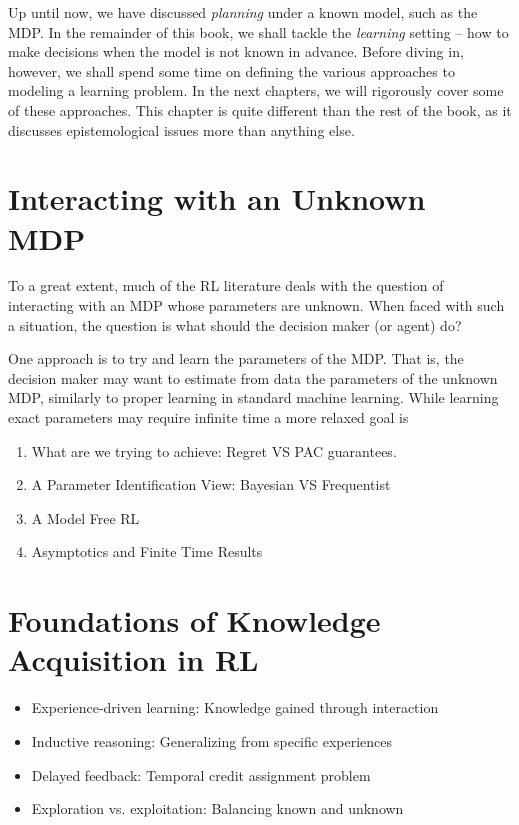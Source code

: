 Up until now, we have discussed \textit{planning} under a known model, such as the MDP. In the remainder of this book, we shall tackle the \textit{learning} setting -- how to make decisions when the model is not known in advance. Before diving in, however, we shall spend some time on defining the various approaches to modeling a learning problem. In the next chapters, we will rigorously cover some of these approaches. This chapter is quite different than the rest of the book, as it discusses epistemological issues more than anything else. 

\section{Interacting with an Unknown MDP}

To a great extent, much of the RL literature deals with the question of interacting with an MDP whose parameters are unknown. When faced with such a situation, the question is what should the decision maker (or agent) do? 

One approach is to try and learn the parameters of the MDP. That is, the decision maker may want to estimate from data the parameters of the unknown MDP, similarly to proper learning in standard machine learning. While learning exact parameters may require infinite time a more relaxed goal is 

\begin{enumerate}
    \item 
What are we trying to achieve: Regret VS PAC guarantees.
\item A Parameter Identification View:
Bayesian VS Frequentist
\item A Model Free RL
\item Asymptotics and Finite Time Results
\end{enumerate}


\section{Foundations of Knowledge Acquisition in RL}
\begin{itemize}
    \item Experience-driven learning: Knowledge gained through interaction
    \item Inductive reasoning: Generalizing from specific experiences
    \item Delayed feedback: Temporal credit assignment problem
    \item Exploration vs. exploitation: Balancing known and unknown
\end{itemize}

